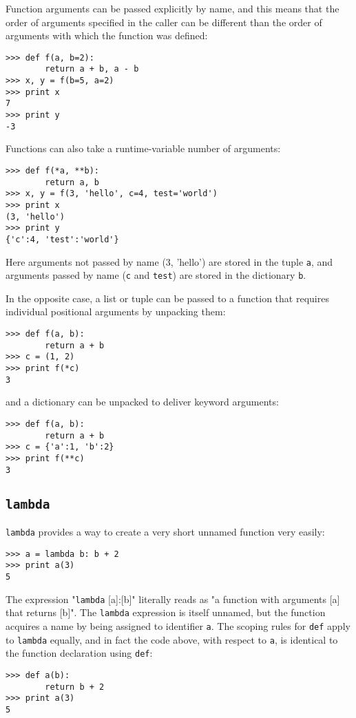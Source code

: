 \documentclass[justified,sixbynine,notoc]{tufte-book}
\def\ft{\small\tt}
\def\inxx#1{\index{#1}}
\begin{document}
\begin{fullwidth}
Function arguments can be passed explicitly by name, and this means that the order of arguments specified in the caller can be different than the order of arguments with which the function was defined:
\begin{lstlisting}
>>> def f(a, b=2):
        return a + b, a - b
>>> x, y = f(b=5, a=2)
>>> print x
7
>>> print y
-3
\end{lstlisting}

Functions can also take a runtime-variable number of arguments:
\begin{lstlisting}
>>> def f(*a, **b):
        return a, b
>>> x, y = f(3, 'hello', c=4, test='world')
>>> print x
(3, 'hello')
>>> print y
{'c':4, 'test':'world'}
\end{lstlisting}

Here arguments not passed by name (3, 'hello') are stored in the tuple {\ft a}, and arguments passed by name ({\ft c} and {\ft test}) are stored in the dictionary {\ft b}.

In the opposite case, a list or tuple can be passed to a function that requires individual positional arguments by unpacking them:
\begin{lstlisting}
>>> def f(a, b):
        return a + b
>>> c = (1, 2)
>>> print f(*c)
3
\end{lstlisting}
\noindent and a dictionary can be unpacked to deliver keyword arguments:
\begin{lstlisting}
>>> def f(a, b):
        return a + b
>>> c = {'a':1, 'b':2}
>>> print f(**c)
3
\end{lstlisting}

\goodbreak\subsection{{\ft lambda}}

\inxx{lambda}

{\ft lambda} provides a way to create a very short unnamed function very easily:
\begin{lstlisting}
>>> a = lambda b: b + 2
>>> print a(3)
5
\end{lstlisting}

The expression "{\ft lambda} [a]:[b]" literally reads as "a function with arguments [a] that returns [b]". The {\ft lambda} expression is itself unnamed, but the function acquires a name by being assigned to identifier {\ft a}.  The scoping rules for {\ft def} apply to {\ft lambda} equally, and in fact the code above, with respect to {\ft a}, is identical to the function declaration using {\ft def}:
\begin{lstlisting}
>>> def a(b):
        return b + 2
>>> print a(3)
5
\end{lstlisting}


\end{fullwidth}
\end{document}
